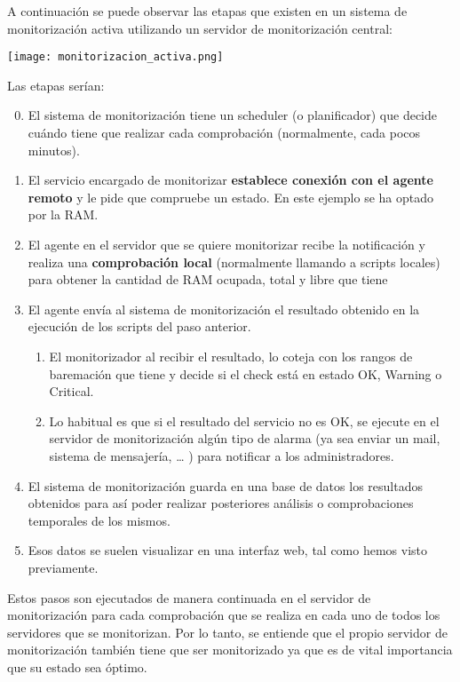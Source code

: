 A continuación se puede observar las etapas que existen en un sistema de monitorización activa utilizando un servidor de monitorización central:

\begin{tcolorbox}[colback=white,title=Proceso de monitorización activa]
    \centering
    \texttt{[image: monitorizacion\_activa.png]}
\end{tcolorbox}

Las etapas serían:
\begin{enumerate}
    \setcounter{enumi}{-1}
    \item El sistema de monitorización tiene un scheduler (o planificador) que decide cuándo tiene que realizar cada comprobación (normalmente, cada pocos minutos).
    \item El servicio encargado de monitorizar \textbf{establece conexión con el agente remoto} y le pide que compruebe un estado. En este ejemplo se ha optado por la RAM.
    \item El agente en el servidor que se quiere monitorizar recibe la notificación y realiza una \textbf{comprobación local} (normalmente llamando a scripts locales) para obtener la cantidad de RAM ocupada, total y libre que tiene
    \item El agente envía al sistema de monitorización el resultado obtenido en la ejecución de los scripts del paso anterior.
    \begin{enumerate}
        \item El monitorizador al recibir el resultado, lo coteja con los rangos de baremación que tiene y decide si el check está en estado OK, Warning o Critical.
        \item Lo habitual es que si el resultado del servicio no es OK, se ejecute en el servidor de monitorización algún tipo de alarma (ya sea enviar un mail, sistema de mensajería, … ) para notificar a los administradores.
    \end{enumerate}
    \item El sistema de monitorización guarda en una base de datos los resultados obtenidos para así poder realizar posteriores análisis o comprobaciones temporales de los mismos.
    \item Esos datos se suelen visualizar en una interfaz web, tal como hemos visto previamente.
\end{enumerate}

Estos pasos son ejecutados de manera continuada en el servidor de monitorización para cada comprobación que se realiza en cada uno de todos los servidores que se monitorizan. Por lo tanto, se entiende que el propio servidor de monitorización también tiene que ser monitorizado ya que es de vital importancia que su estado sea óptimo.

